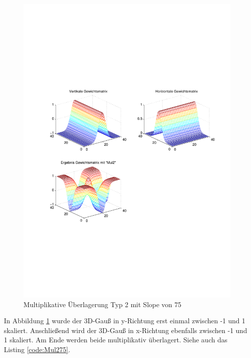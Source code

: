 \newpage
\begin{figure}[hbt]
	\centering
	\includegraphics[trim=70 191 42 152, clip, width=0.95\linewidth]{./Bilder/Auswertung/GewichtmatrixEinzelschritte/Endergebnis_Gewichtsmatrix_Slope_75_Type_Mul2}
	\caption{Multiplikative Überlagerung Typ 2 mit Slope von 75}
	\label{Mul275}
\end{figure}

In Abbildung \ref{Mul275} wurde der 3D-Gauß in y-Richtung erst einmal zwischen -1 und 1 skaliert. Anschließend wird der 3D-Gauß in x-Richtung ebenfalls zwischen -1 und 1 skaliert. Am Ende werden beide multiplikativ überlagert. Siehe auch das Listing \ref{code:Mul275}.



\newpage
